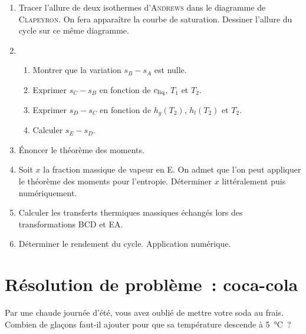 \documentclass[a4paper, 10pt, final, garamond]{book}
\begin{document}
\begin{enumerate}
  \item Tracer l'allure de deux isothermes d'\textsc{Andrews} dans le diagramme
    de \textsc{Clapeyron}. On fera apparaître la courbe de saturation. Dessiner
    l'allure du cycle sur ce même diagramme.
  \item 
    \begin{enumerate}
      \item Montrer que la variation $s_B - s_A$ est nulle.
      \item Exprimer $s_C - s_B$ en fonction de $c_{\rm liq}$, $T_1$ et $T_2$.
      \item Exprimer $s_D - s_C$ en fonction de $h_g(T_2)$, $h_l(T_2)$ et $T_2$.
      \item Calculer $s_E - s_D$.
    \end{enumerate}
  \item Énoncer le théorème des moments.
  \item Soit $x$ la fraction massique de vapeur en E. On admet que l'on peut
    appliquer le théorème des moments pour l'entropie. Déterminer $x$
    littéralement puis numériquement.
  \item Calculer les transferts thermiques massiques échangés lors des
    transformations BCD et EA.
  \item Déterminer le rendement du cycle. Application numérique.
\end{enumerate}

\section{Résolution de problème~: coca-cola}
Par une chaude journée d'été, vous avez oublié de mettre votre soda au frais.
Combien de glaçons faut-il ajouter pour que sa température descende à
\SI{5}{\degreeCelsius}~?
\end{document}
